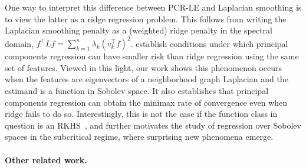 One way to interpret this difference between PCR-LE and Laplacian smoothing is to view the latter as a ridge regression problem. This follows from writing the Laplacian smoothing penalty as a (weighted) ridge penalty in the spectral domain,  $f^{\top} L f  = \sum_{k = 1}^{n} \lambda_k(v_k^{\top}f)^2$. \citet{dhillon2013} establish conditions under which principal components regression can have smaller risk than ridge regression using the same set of features. Viewed in this light, our work shows this phenomenon occurs when the features are eigenvectors of a neighborhood graph Laplacian and the estimand is a function in Sobolev space. It also establishes that principal components regression can obtain the minimax rate of convergence even when ridge fails to do so. Interestingly, this is not the case if the function class in question is an RKHS~\citep{dicker2017}, and further motivates the study of regression over Sobolev spaces in the subcritical regime, where surprising new phenomena emerge.

\paragraph{Other related work.}

